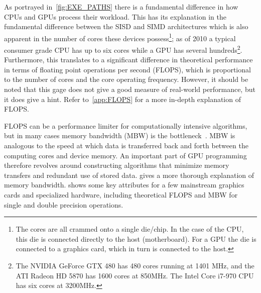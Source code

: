\documentclass[11pt,twoside]{report}
\begin{document}
\indent As portrayed in~\cref{fig:EXE_PATHS} there is a fundamental difference in how CPUs and GPUs process their workload. This has its explanation in the fundamental difference between the SISD and SIMD architectures which is also apparent in the number of cores these devices possess\footnote{The cores are all crammed onto a single die/chip. In the case of the CPU, this die is connected directly to the host (motherboard). For a GPU the die is connected to a graphics card, which in turn is connected to the host.}; as of 2010 a typical consumer grade CPU has up to six cores while a GPU has several hundreds\footnote{The NVIDIA GeForce GTX 480 has 480 cores running at 1401 MHz, and the ATI Radeon HD 5870 has 1600 cores at 850MHz. The Intel Core i7-970 CPU has six cores at 3200MHz.}. Furthermore, this translates to a significant difference in theoretical performance in terms of floating point operations per second (FLOPS), which is proportional to the number of cores and the core operating frequency. However, it should be noted that this gage does not give a good measure of real-world performance, but it does give a hint. Refer to~\cref{app:FLOPS} for a more in-depth explanation of FLOPS.


\indent FLOPS can be a performance limiter for computationally intensive algorithms, but in many cases memory bandwidth (MBW) is the bottleneck~\cite{Ryoo:2008:OPA:1345206.1345220}. MBW is analogous to the speed at which data is transferred back and forth between the computing cores and device memory. An important part of GPU programming therefore revolves around constructing algorithms that minimize memory transfers and redundant use of stored data.  gives a more thorough explanation of memory bandwidth.  shows some key attributes for a few mainstream graphics cards and specialized hardware, including theoretical  FLOPS and MBW for single and double precision operations. 


\end{document}
